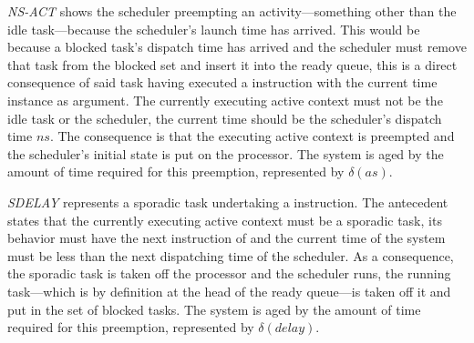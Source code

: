 
\emph{NS-ACT} shows the scheduler preempting an activity---something
other than the idle task---because the scheduler's launch time has
arrived. This would be because a blocked task's dispatch time has
arrived and the scheduler must remove that task from the blocked set
and insert it into the ready queue, this is a direct consequence of
said task having executed a  instruction with the
current time instance as argument. The currently executing active
context must not be the idle task or the scheduler, the current time
should be the scheduler's dispatch time $ns$. The consequence is that
the executing active context is preempted and the scheduler's initial
state is put on the processor. The system is aged by the amount of
time required for this preemption, represented by $\delta(as)$.

%
%

\emph{SDELAY} represents a sporadic task undertaking a  instruction. The antecedent states that the currently
executing active context must be a sporadic task, its behavior must
have the next instruction of  and the current time of
the system must be less than the next dispatching time of the
scheduler. As a consequence, the sporadic task is taken off the
processor and the scheduler runs, the running task---which is by
definition at the head of the ready queue---is taken off it and put in
the set of blocked tasks. The system is aged by the amount of time
required for this preemption, represented by $\delta(delay)$.


